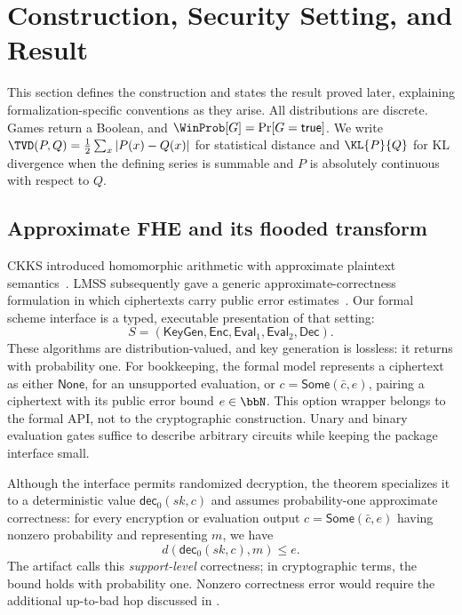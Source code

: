 \section{Construction, Security Setting, and Result}
\label{sec:security-model}

This section defines the construction and states the result proved later,
explaining formalization-specific conventions as they arise.
All distributions are discrete.
Games return a Boolean, and
\(\WinProb[G]=\Pr[G=\mathsf{true}]\).
We write
\(\TVD(P,Q)=\tfrac12\sum_x|P(x)-Q(x)|\) for statistical distance and
\(\KL{P}{Q}\) for KL divergence when the defining series is summable and
\(P\) is absolutely continuous with respect to \(Q\).

\subsection{Approximate FHE and its flooded transform}
\label{sec:construction}

CKKS introduced homomorphic arithmetic with approximate plaintext
semantics~\cite{ckks}.
LMSS subsequently gave a generic approximate-correctness formulation in which
ciphertexts carry public error estimates~\cite{lmss}.
Our formal scheme interface is a typed, executable presentation of that
setting:
\[
 S=(\mathsf{KeyGen},\mathsf{Enc},\mathsf{Eval}_1,
       \mathsf{Eval}_2,\mathsf{Dec}).
\]
These algorithms are distribution-valued, and key generation is lossless: it
returns with probability one.
For bookkeeping, the formal model represents a ciphertext as either
\(\mathsf{None}\), for an unsupported evaluation, or
\(c=\mathsf{Some}(\bar c,e)\), pairing a ciphertext with its public error bound
\(e\in\bbN\).
This option wrapper belongs to the formal API, not to the cryptographic
construction.
Unary and binary evaluation gates suffice to describe arbitrary circuits while
keeping the package interface small.

Although the interface permits randomized decryption, the theorem specializes
it to a deterministic value \(\mathsf{dec}_0(sk,c)\) and assumes
probability-one approximate correctness:
for every encryption or evaluation output
\(c=\mathsf{Some}(\bar c,e)\) having nonzero probability and representing
\(m\), we have
\begin{equation}
\label{eq:approx-correctness}
 d(\mathsf{dec}_0(sk,c),m)\leq e.
\end{equation}
The artifact calls this \emph{support-level} correctness; in cryptographic
terms, the bound holds with probability one.
Nonzero correctness error would require the additional up-to-bad hop discussed
in .

